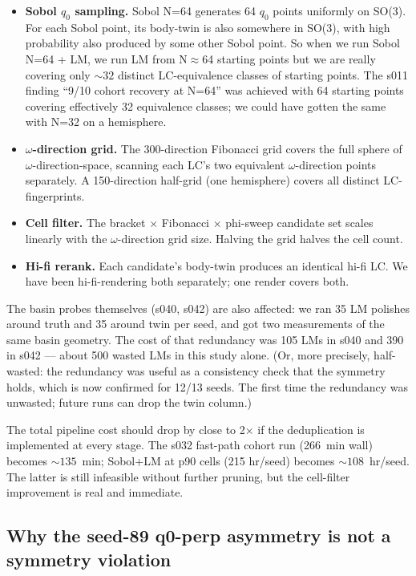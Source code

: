 \documentclass[11pt,a4paper]{article}
\begin{document}
\begin{itemize}
\item \textbf{Sobol $q_0$ sampling.} Sobol N=64 generates 64 $q_0$ points uniformly on SO(3). For each Sobol point, its body-twin is also somewhere in SO(3), with high probability also produced by some other Sobol point. So when we run Sobol N=64 + LM, we run LM from N$\approx$64 starting points but we are really covering only $\sim 32$ distinct LC-equivalence classes of starting points. The s011 finding ``9/10 cohort recovery at N=64'' was achieved with 64 starting points covering effectively 32 equivalence classes; we could have gotten the same with N=32 on a hemisphere.
\item \textbf{$\omega$-direction grid.} The 300-direction Fibonacci grid covers the full sphere of $\omega$-direction-space, scanning each LC's two equivalent $\omega$-direction points separately. A 150-direction half-grid (one hemisphere) covers all distinct LC-fingerprints.
\item \textbf{Cell filter.} The bracket $\times$ Fibonacci $\times$ phi-sweep candidate set scales linearly with the $\omega$-direction grid size. Halving the grid halves the cell count.
\item \textbf{Hi-fi rerank.} Each candidate's body-twin produces an identical hi-fi LC. We have been hi-fi-rendering both separately; one render covers both.
\end{itemize}

The basin probes themselves (s040, s042) are also affected: we ran 35 LM polishes around truth and 35 around twin per seed, and got two measurements of the same basin geometry. The cost of that redundancy was 105 LMs in s040 and 390 in s042 --- about 500 wasted LMs in this study alone. (Or, more precisely, half-wasted: the redundancy was useful as a consistency check that the symmetry holds, which is now confirmed for 12/13 seeds. The first time the redundancy was unwasted; future runs can drop the twin column.)

The total pipeline cost should drop by close to 2$\times$ if the deduplication is implemented at every stage. The s032 fast-path cohort run (266~min wall) becomes $\sim 135$~min; Sobol+LM at p90 cells (215 hr/seed) becomes $\sim 108$~hr/seed. The latter is still infeasible without further pruning, but the cell-filter improvement is real and immediate.

\subsection{Why the seed-89 q0-perp asymmetry is not a symmetry violation}
\end{document}
